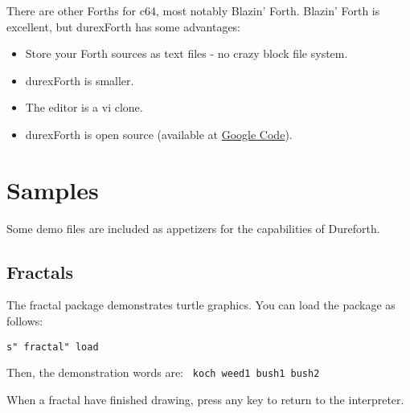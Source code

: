 There are other Forths for c64, most notably Blazin' Forth. Blazin' Forth is excellent, but durexForth has some advantages:

\begin{itemize}
\item Store your Forth sources as text files - no crazy block file system.
\item durexForth is smaller.
\item The editor is a vi clone.
\item durexForth is open source (available at \href{http://code.google.com/p/durexforth/}{Google Code}).
\end{itemize}

\section{Samples}

Some demo files are included as appetizers for the capabilities of Dureforth.

\subsection{Fractals}

The fractal package demonstrates turtle graphics. You can load the package as follows:

\texttt{s" fractal" load}

Then, the demonstration words are: \texttt{ koch weed1 bush1 bush2 }

When a fractal have finished drawing, press any key to return to the interpreter.
